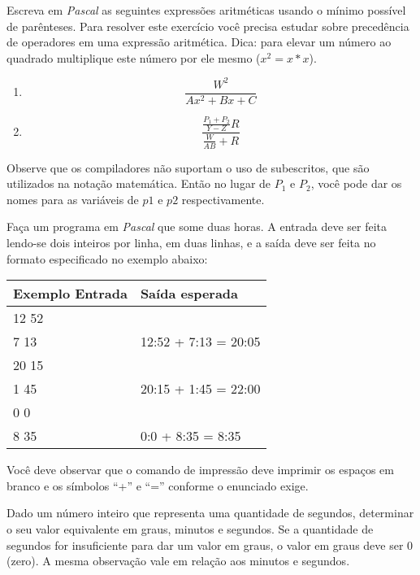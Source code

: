 \item Escreva em \emph{Pascal} as seguintes expressões
aritméticas usando o mínimo possível de parênteses.
Para resolver este exercício você precisa estudar sobre precedência
de operadores em uma expressão aritmética. Dica: para elevar um número
ao quadrado multiplique este número por ele mesmo ($x^2 = x * x$).

\begin{enumerate}
\item 
     \[ \frac{W^2}{Ax^2 + Bx +C} \]

\item 
     \[ \frac{\frac{P_1 + P_2}{Y - Z}R}{\frac{W}{AB} + R} \]
\end{enumerate}

\noindent
Observe que os compiladores não suportam o uso de subescritos, que são
utilizados na notação matemática. Então no lugar de $P_1$ e $P_2$, você
pode dar os nomes para as variáveis de $p1$ e $p2$ respectivamente.

\item Faça um programa em \emph{Pascal}
que some duas horas. A entrada deve ser feita lendo-se
dois inteiros por linha, em duas linhas, e a saída
deve ser feita no formato especificado no exemplo
abaixo:

\begin{center}
\begin{tabular}{|l|l|} \hline
Exemplo Entrada & Saída esperada \\ \hline
12 52           &                \\ 
7 13            & 12:52 + 7:13 = 20:05 \\ \hline
20 15           &                \\ 
1 45            & 20:15 + 1:45 = 22:00  \\ \hline
0 0             &                \\ 
8 35            & 0:0 + 8:35 = 8:35  \\ \hline
\end{tabular}
\end{center}

Você deve observar que o comando de impressão deve imprimir os espaços em branco e
os símbolos ``+'' e ``='' conforme o enunciado exige.

\item Dado um número inteiro que representa uma quantidade de segundos,
   determinar o seu valor equivalente em graus, minutos e segundos. Se
   a quantidade de segundos for insuficiente para dar um valor em graus,
   o valor em graus deve ser 0 (zero). A mesma observação vale em
   relação aos minutos e segundos. 


